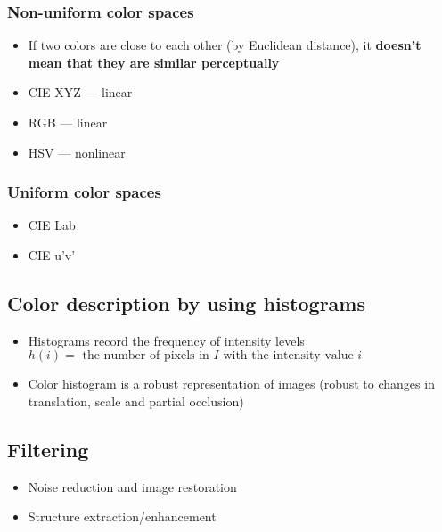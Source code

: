 \documentclass{article}
\begin{document}
                \subsubsection{Non-uniform color spaces}
                \begin{itemize}
                    \item If two colors are close to each other (by Euclidean distance), it \textbf{doesn't mean that they are similar perceptually}
                    \item CIE XYZ --- linear
                    \item RGB --- linear
                    \item HSV --- nonlinear
                \end{itemize}

                \subsubsection{Uniform color spaces}
                \begin{itemize}
                    \item CIE Lab
                    \item CIE u'v'
                \end{itemize}

        \subsection{Color description by using histograms}
        \begin{itemize}
            \item Histograms record the frequency of intensity levels \\
                  $h(i) = \text{ the number of pixels in } I \text{ with the intensity value } i$
            \item Color histogram is a robust representation of images (robust to changes in translation, scale and partial occlusion)
        \end{itemize}

        \subsection{Filtering}
        \begin{itemize}
            \item Noise reduction and image restoration
            \item Structure extraction/enhancement
        \end{itemize}
\end{document}
